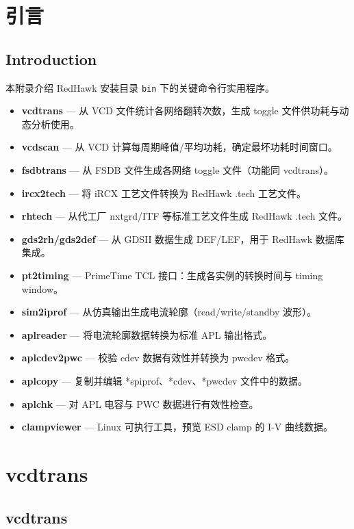 \label{chap:util}

\section{引言}
\subsection*{Introduction}

本附录介绍 RedHawk 安装目录 \texttt{bin} 下的关键命令行实用程序。

\begin{itemize}
\item \textbf{vcdtrans} — 从 VCD 文件统计各网络翻转次数，生成 toggle 文件供功耗与动态分析使用。
\item \textbf{vcdscan} — 从 VCD 计算每周期峰值/平均功耗，确定最坏功耗时间窗口。
\item \textbf{fsdbtrans} — 从 FSDB 文件生成各网络 toggle 文件（功能同 vcdtrans）。
\item \textbf{ircx2tech} — 将 iRCX 工艺文件转换为 RedHawk .tech 工艺文件。
\item \textbf{rhtech} — 从代工厂 nxtgrd/ITF 等标准工艺文件生成 RedHawk .tech 文件。
\item \textbf{gds2rh/gds2def} — 从 GDSII 数据生成 DEF/LEF，用于 RedHawk 数据库集成。
\item \textbf{pt2timing} — PrimeTime TCL 接口：生成各实例的转换时间与 timing window。
\item \textbf{sim2iprof} — 从仿真输出生成电流轮廓（read/write/standby 波形）。
\item \textbf{aplreader} — 将电流轮廓数据转换为标准 APL 输出格式。
\item \textbf{aplcdev2pwc} — 校验 cdev 数据有效性并转换为 pwcdev 格式。
\item \textbf{aplcopy} — 复制并编辑 *spiprof、*cdev、*pwcdev 文件中的数据。
\item \textbf{aplchk} — 对 APL 电容与 PWC 数据进行有效性检查。
\item \textbf{clampviewer} — Linux 可执行工具，预览 ESD clamp 的 I-V 曲线数据。
\end{itemize}

\section{vcdtrans}
\subsection*{vcdtrans}

